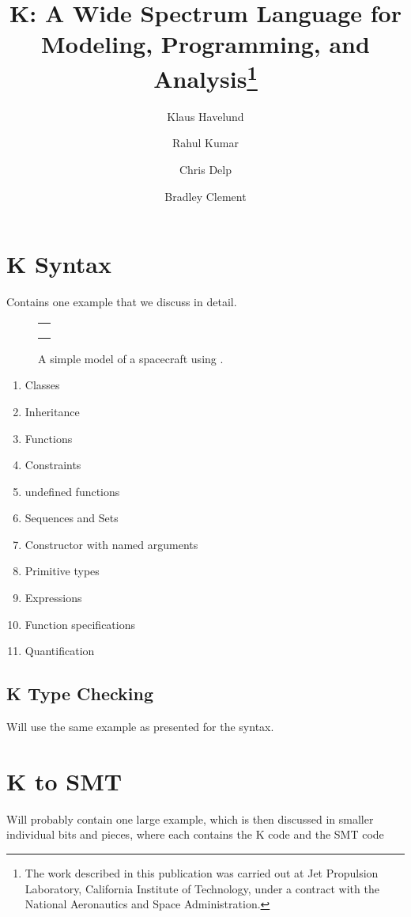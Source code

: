 \documentclass{llncs}
\title{K: A Wide Spectrum Language for Modeling, Programming, and
  Analysis\thanks{ The work described in this publication was carried
    out at Jet Propulsion Laboratory, California Institute of
    Technology, under a contract with the National Aeronautics and
    Space Administration.}}
\author{
  Klaus Havelund 
  \and 
  Rahul Kumar 
  \and 
  Chris Delp
  \and
  Bradley Clement
}
\institute{ Jet Propulsion Laboratory\\ 
            California Institute of Technology\\ 
            California, USA }
\begin{document}
\maketitle





\section{K Syntax}

Contains one example that we discuss in detail. 

\begin{figure}
\centering
\begin{tabular}{c}
\hline \\
 \\ \\
\hline
\end{tabular}
\caption{A simple model of a spacecraft using \Klang{}.}
\label{fig:spacecraftSmt}
\end{figure}

\begin{enumerate}
\item Classes
\item Inheritance
\item Functions
\item Constraints
\item undefined functions
\item Sequences and Sets
\item Constructor with named arguments
\item Primitive types
\item Expressions
\item Function specifications
\item Quantification
\end{enumerate}

\subsection{K Type Checking}

Will use the same example as presented for the syntax.

\section{K to SMT}

Will probably contain one large example, which is then discussed in
smaller individual bits and pieces, where each contains the K code and
the SMT code
\end{document}
